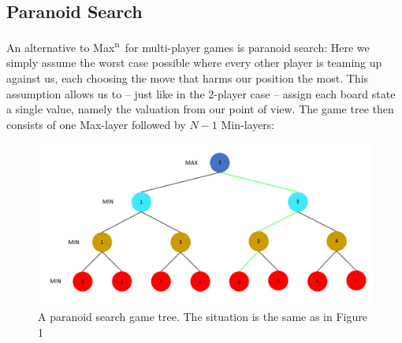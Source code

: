 \documentclass[a4paper,12pt]{article}
\newcommand{\Maxn}{Max\textsuperscript{n}\ }
\begin{document}
    \subsection{Paranoid Search}
    An alternative to \Maxn for multi-player games is paranoid search: Here we simply assume the worst case possible where every other player is teaming up against us, each choosing the move that harms our position the most. This assumption allows us to -- just like in the 2-player case -- assign each board state a single value, namely the valuation from our point of view. The game tree then consists of one Max-layer followed by $N-1$ Min-layers:
    
    \begin{figure}[H]
        \centering
        \includegraphics[width=\textwidth,keepaspectratio]{pictures/assignment3/ParanoidSearchTree.png}
        \caption{A paranoid search game tree. The situation is the same as in Figure 1}
    \end{figure}
    
\end{document}

